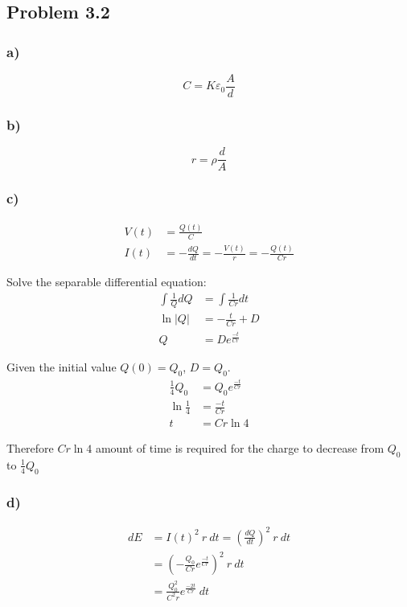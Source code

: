 \documentclass[../homework.tex]{subfiles}
\begin{document}
\subsection{Problem 3.2}
\subsubsection*{a)}
\begin{equation*}
    C = K \varepsilon_0 \frac{A}{d}
\end{equation*}
\subsubsection*{b)}
\begin{equation*}
    r = \rho \frac{d}{A}
\end{equation*}

\subsubsection*{c)}
\begin{align*}
    V(t) &= \frac{Q(t)}{C} \\
    I(t) &= -\frac{dQ}{dt} = -\frac{V(t)}{r} = -\frac{Q(t)}{Cr}
\end{align*}

Solve the separable differential equation:
\begin{align*}
    \int \frac{1}{Q} dQ &= \int \frac{1}{Cr} dt \\
    \ln{|Q|} &= -\frac{t}{Cr} + D \\
    Q &= D e^{\frac{-t}{Cr}}
\end{align*}

Given the initial value $Q(0) = Q_0$, $D = Q_0$. 
\begin{align*}
    \frac{1}{4}Q_0 &= Q_0 e^{\frac{-t}{Cr}} \\
    \ln{\frac{1}{4}} &= \frac{-t}{Cr} \\
    t &= Cr\ln{4}
\end{align*}

Therefore $Cr\ln{4}$ amount of time is required for the charge to decrease from $Q_0$ to $\frac{1}{4}Q_0$

\subsubsection*{d)}
\begin{align*}
    dE &= I(t)^2~r~dt = \left(\frac{dQ}{dt}\right)^2~r~dt \\
     &= \left(-\frac{Q_0}{Cr} e^{\frac{-t}{Cr}}\right)^2~r~dt \\
     &= \frac{Q_0^2}{C^2 r} e^{\frac{-2t}{Cr}}~dt
\end{align*}
\end{document}
